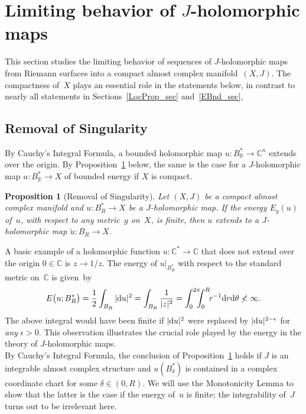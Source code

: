 \documentclass[11pt]{article}
\numberwithin{equation}{section}
\newtheorem{prp}[thm]{Proposition}
\theoremstyle{definition}
\def\ti#1{\widetilde{#1}}
\def\lra{\longrightarrow}
\def\C{\mathbb{C}}
\def\R{\mathbb R}
\def\de{\delta}
\def\ep{\epsilon}
\def\th{\theta}
\def\i{\infty}
\def\nd{\textnormal{d}}
\begin{document}
\section{Limiting behavior of $J$-holomorphic maps}
\label{GlobProp_sec}

\noindent
This section studies the limiting behavior of sequences of $J$-holomorphic maps 
from Riemann surfaces into a compact almost complex manifold~$(X,J)$.
The compactness of~$X$ plays an essential role in the statements below,
in contrast to nearly all statements in Sections~\ref{LocProp_sec} and~\ref{EBnd_sec},




\subsection{Removal of Singularity}
\label{RemSing_subs}

\noindent
By Cauchy's Integral Formula, a bounded holomorphic map $u\!:B_{\R}^*\!\lra\!\C^n$ 
extends over the origin.
By Proposition~\ref{RemSing_prp} below, the same is the case
for a $J$-holomorphic map $u\!:B_{\R}^*\!\lra\!X$ of bounded energy
if $X$ is compact.



\begin{prp}[Removal of Singularity]\label{RemSing_prp}
Let $(X,J)$ be a compact almost complex manifold
and $u\!:B_R^*\!\lra\!X$ be a $J$-holomorphic map.
If the energy $E_g(u)$ of~$u$, with respect to any metric~$g$ on~$X$, 
is finite, then $u$ extends to a $J$-holomorphic map 
$\ti{u}\!:B_R\!\lra\!X$.
\end{prp}

\noindent
A basic example of a holomorphic function $u\!:\C^*\!\lra\!\C$ that does not extend
over the origin $0\!\in\!\C$ is $z\!\lra\!1/z$.
The energy of $u|_{B_R^*}$ with respect to the standard metric on~$\C$ is 
given~by 
$$E\big(u;B_R^*\big)
=\frac12\int_{B_R}|\nd u|^2
=\int_{B_R}\frac{1}{|z|^2} 
=\int_0^{2\pi}\!\!\!\!\int_0^R\!\! r^{-1}\nd r\nd\th \not<\i.$$
The above integral would have been finite if $|\nd u|^2$ were replaced by 
$|\nd u|^{2-\ep}$ for {\it any} $\ep\!>\!0$.
This observation illustrates the crucial role played by 
the energy in the theory of $J$-holomorphic maps.\\

\noindent
By Cauchy's Integral Formula, the conclusion of Proposition~\ref{RemSing_prp} holds
if $J$ is an integrable almost complex structure  and $u(B_{\de}^*)$ 
is contained in a complex coordinate chart for some $\de\!\in\!(0,R)$.
We will use the Monotonicity Lemma to show that the latter is the case
if the energy of~$u$ is finite;
the integrability  of~$J$ turns out to be irrelevant here.
\end{document}
